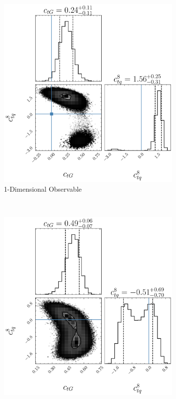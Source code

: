 \documentclass[a4paper,11pt]{article}
\begin{document}
\begin{figure}[htb]
    \centering
    \begin{subfigure}[b]{0.45\textwidth}
        \centering
        \includegraphics[width=\textwidth]{plots/ATLAS-ctg-ctq8_1D_2OP.png}
        \caption{1-Dimensional Observable}
        \label{fig:corner_1D_2OP}
    \end{subfigure}
    ~
    \begin{subfigure}[b]{0.45\textwidth}
        \centering
        \includegraphics[width=\textwidth]{plots/ATLAS-ctg-ctq8_2D_2OP.png}

\end{subfigure}
\end{figure}
\end{document}
